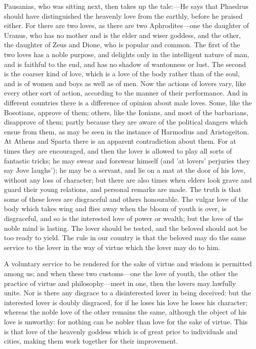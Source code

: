 \documentclass[11pt,letter]{article}
\begin{document}
\par  Pausanias, who was sitting next, then takes up the tale:—He says that Phaedrus should have distinguished the heavenly love from the earthly, before he praised either. For there are two loves, as there are two Aphrodites—one the daughter of Uranus, who has no mother and is the elder and wiser goddess, and the other, the daughter of Zeus and Dione, who is popular and common. The first of the two loves has a noble purpose, and delights only in the intelligent nature of man, and is faithful to the end, and has no shadow of wantonness or lust. The second is the coarser kind of love, which is a love of the body rather than of the soul, and is of women and boys as well as of men. Now the actions of lovers vary, like every other sort of action, according to the manner of their performance. And in different countries there is a difference of opinion about male loves. Some, like the Boeotians, approve of them; others, like the Ionians, and most of the barbarians, disapprove of them; partly because they are aware of the political dangers which ensue from them, as may be seen in the instance of Harmodius and Aristogeiton. At Athens and Sparta there is an apparent contradiction about them. For at times they are encouraged, and then the lover is allowed to play all sorts of fantastic tricks; he may swear and forswear himself (and 'at lovers' perjuries they say Jove laughs'); he may be a servant, and lie on a mat at the door of his love, without any loss of character; but there are also times when elders look grave and guard their young relations, and personal remarks are made. The truth is that some of these loves are disgraceful and others honourable. The vulgar love of the body which takes wing and flies away when the bloom of youth is over, is disgraceful, and so is the interested love of power or wealth; but the love of the noble mind is lasting. The lover should be tested, and the beloved should not be too ready to yield. The rule in our country is that the beloved may do the same service to the lover in the way of virtue which the lover may do to him.

\par  A voluntary service to be rendered for the sake of virtue and wisdom is permitted among us; and when these two customs—one the love of youth, the other the practice of virtue and philosophy—meet in one, then the lovers may lawfully unite. Nor is there any disgrace to a disinterested lover in being deceived: but the interested lover is doubly disgraced, for if he loses his love he loses his character; whereas the noble love of the other remains the same, although the object of his love is unworthy: for nothing can be nobler than love for the sake of virtue. This is that love of the heavenly goddess which is of great price to individuals and cities, making them work together for their improvement.
\end{document}
